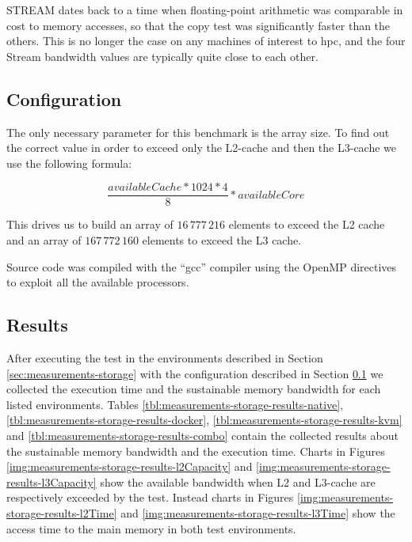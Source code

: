 STREAM dates back to a time when floating-point arithmetic was comparable in cost to memory accesses,
so that the copy test was significantly faster than the others. This is no longer the case on any machines
of interest to \ac{hpc}, and the four Stream bandwidth values are typically quite close to each other.

\subsection{Configuration}
\label{sec:measurements-storage-configuration}
The only necessary parameter for this benchmark is the array size. To find out the correct value
in order to exceed only the L2-cache and then the L3-cache we use the following formula:

\begin{center}
	\begin{equation}
		\frac{availableCache * 1024 * 4}{8} * availableCore
	\end{equation}
\end{center}

This drives us to build an array of $16\,777\,216$ elements to exceed the L2 cache and an array of
$167\,772\,160$ elements to exceed the L3 cache.

Source code was compiled with the ``gcc'' compiler using the OpenMP directives to exploit all the
available processors.

\subsection{Results}
\label{sec:measurements-storage-results}
After executing the test in the environments described in Section \ref{sec:measurements-storage} with
the configuration described in Section \ref{sec:measurements-storage-configuration} we collected the
execution time and the sustainable memory bandwidth for each listed environments.
Tables \ref{tbl:measurements-storage-results-native}, \ref{tbl:measurements-storage-results-docker},
\ref{tbl:measurements-storage-results-kvm} and \ref{tbl:measurements-storage-results-combo} contain
the collected results about the sustainable memory bandwidth and the execution time. Charts in Figures 
\ref{img:measurements-storage-results-l2Capacity} and \ref{img:measurements-storage-results-l3Capacity}
show the available bandwidth when L2 and L3-cache are respectively exceeded by the test. Instead charts
in Figures  \ref{img:measurements-storage-results-l2Time} and \ref{img:measurements-storage-results-l3Time}
show the access time to the main memory in both test environments.

